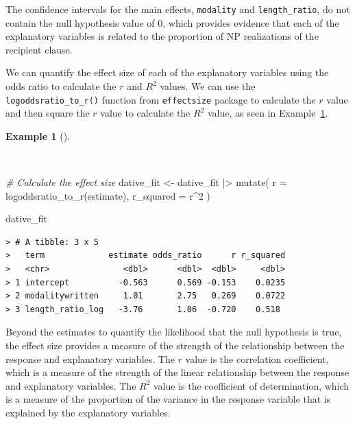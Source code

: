 \documentclass[
  letterpaper,
  DIV=11,
  numbers=noendperiod]{scrreprt}
\newenvironment{Shaded}{\begin{snugshade}}{\end{snugshade}}
\newcommand{\AttributeTok}[1]{\textcolor[rgb]{0.00,0.00,0.00}{#1}}
\newcommand{\CommentTok}[1]{\textcolor[rgb]{0.00,0.00,0.00}{\textit{#1}}}
\newcommand{\DecValTok}[1]{\textcolor[rgb]{0.00,0.00,0.00}{#1}}
\newcommand{\FunctionTok}[1]{\textcolor[rgb]{0.00,0.00,0.00}{#1}}
\newcommand{\NormalTok}[1]{\textcolor[rgb]{0.00,0.00,0.00}{#1}}
\newcommand{\OtherTok}[1]{\textcolor[rgb]{0.00,0.00,0.00}{#1}}
\newcommand{\SpecialCharTok}[1]{\textcolor[rgb]{0.00,0.00,0.00}{#1}}
\theoremstyle{definition}
\newtheorem{example}{Example}[chapter]
\theoremstyle{remark}
\begin{document}
The confidence intervals for the main effects, \texttt{modality} and
\texttt{length\_ratio}, do not contain the null hypothesis value of 0,
which provides evidence that each of the explanatory variables is
related to the proportion of NP realizations of the recipient clause.

We can quantify the effect size of each of the explanatory variables
using the odds ratio to calculate the \(r\) and \(R^2\) values. We can
use the \texttt{logoddsratio\_to\_r()} function from \texttt{effectsize}
package to calculate the \(r\) value and then square the \(r\) value to
calculate the \(R^2\) value, as seen in
Example~\ref{exm-ida-cat-effect-size-logistic-regression}.

\begin{example}[]\protect\hypertarget{exm-ida-cat-effect-size-logistic-regression}{}\label{exm-ida-cat-effect-size-logistic-regression}

~

\begin{Shaded}
\begin{Highlighting}[]
\CommentTok{\# Calculate the effect size}
\NormalTok{dative\_fit }\OtherTok{\textless{}{-}}
\NormalTok{  dative\_fit }\SpecialCharTok{|\textgreater{}}
  \FunctionTok{mutate}\NormalTok{(}
    \AttributeTok{r =} \FunctionTok{logoddsratio\_to\_r}\NormalTok{(estimate),}
    \AttributeTok{r\_squared =}\NormalTok{ r}\SpecialCharTok{\^{}}\DecValTok{2}
\NormalTok{  )}

\NormalTok{dative\_fit}
\end{Highlighting}
\end{Shaded}

\begin{verbatim}
> # A tibble: 3 x 5
>   term             estimate odds_ratio      r r_squared
>   <chr>               <dbl>      <dbl>  <dbl>     <dbl>
> 1 intercept          -0.563      0.569 -0.153    0.0235
> 2 modalitywritten     1.01       2.75   0.269    0.0722
> 3 length_ratio_log   -3.76       1.06  -0.720    0.518
\end{verbatim}

\end{example}

Beyond the estimates to quantify the likelihood that the null hypothesis
is true, the effect size provides a measure of the strength of the
relationship between the response and explanatory variables. The \(r\)
value is the correlation coefficient, which is a measure of the strength
of the linear relationship between the response and explanatory
variables. The \(R^2\) value is the coefficient of determination, which
is a measure of the proportion of the variance in the response variable
that is explained by the explanatory variables.
\end{document}
